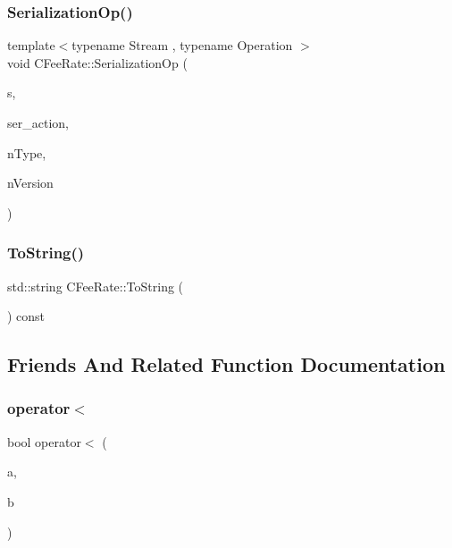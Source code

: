 \mbox{\label{class_c_fee_rate_aface850a2c1af316cedf87d24f04fda3}} 
\subsubsection{\texorpdfstring{Serialization\+Op()}{SerializationOp()}}
{\footnotesize\ttfamily template$<$typename Stream , typename Operation $>$ \\
void C\+Fee\+Rate\+::\+Serialization\+Op (\begin{DoxyParamCaption}\item[{Stream \&}]{s,  }\item[{Operation}]{ser\+\_\+action,  }\item[{int}]{n\+Type,  }\item[{int}]{n\+Version }\end{DoxyParamCaption})\hspace{0.3cm}{\ttfamily [inline]}}

\mbox{\label{class_c_fee_rate_a67a2711583d588edd3dfa2dba682f4ce}} 
\subsubsection{\texorpdfstring{To\+String()}{ToString()}}
{\footnotesize\ttfamily std\+::string C\+Fee\+Rate\+::\+To\+String (\begin{DoxyParamCaption}{ }\end{DoxyParamCaption}) const}



\subsection{Friends And Related Function Documentation}
\mbox{\label{class_c_fee_rate_ac6171d01f1032c0f08e804f2b19e84e8}} 
\subsubsection{\texorpdfstring{operator$<$}{operator<}}
{\footnotesize\ttfamily bool operator$<$ (\begin{DoxyParamCaption}\item[{const \mbox{\hyperlink{class_c_fee_rate}{C\+Fee\+Rate}} \&}]{a,  }\item[{const \mbox{\hyperlink{class_c_fee_rate}{C\+Fee\+Rate}} \&}]{b }\end{DoxyParamCaption})\hspace{0.3cm}{\ttfamily [friend]}}

